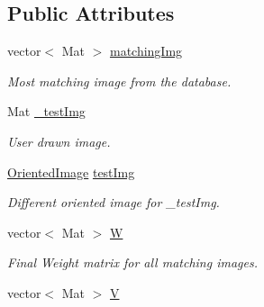\subsection*{\-Public \-Attributes}
\begin{DoxyCompactItemize}
\item 
\hypertarget{classWeightImage_aaca9acca67aadca4d8fa84d1c8d98490}{vector$<$ \-Mat $>$ \hyperlink{classWeightImage_aaca9acca67aadca4d8fa84d1c8d98490}{matching\-Img}}\label{classWeightImage_aaca9acca67aadca4d8fa84d1c8d98490}

\begin{DoxyCompactList}\small\item\em \-Most matching image from the database. \end{DoxyCompactList}\item 
\hypertarget{classWeightImage_a4eaa7ea2349186695b204b8d2bc00915}{\-Mat \hyperlink{classWeightImage_a4eaa7ea2349186695b204b8d2bc00915}{\-\_\-test\-Img}}\label{classWeightImage_a4eaa7ea2349186695b204b8d2bc00915}

\begin{DoxyCompactList}\small\item\em \-User drawn image. \end{DoxyCompactList}\item 
\hypertarget{classWeightImage_abf088bef022ae9533b835145c98512ea}{\hyperlink{classOrientedImage}{\-Oriented\-Image} \hyperlink{classWeightImage_abf088bef022ae9533b835145c98512ea}{test\-Img}}\label{classWeightImage_abf088bef022ae9533b835145c98512ea}

\begin{DoxyCompactList}\small\item\em \-Different oriented image for \-\_\-test\-Img. \end{DoxyCompactList}\item 
\hypertarget{classWeightImage_ad5eb5fe21dee1079c1b90e7d595e7860}{vector$<$ \-Mat $>$ \hyperlink{classWeightImage_ad5eb5fe21dee1079c1b90e7d595e7860}{\-W}}\label{classWeightImage_ad5eb5fe21dee1079c1b90e7d595e7860}

\begin{DoxyCompactList}\small\item\em \-Final \-Weight matrix for all matching images. \end{DoxyCompactList}\item 
\hypertarget{classWeightImage_a84ec6c3e7d354edec8681cd1e35f8659}{vector$<$ \-Mat $>$ \hyperlink{classWeightImage_a84ec6c3e7d354edec8681cd1e35f8659}{\-V}}\label{classWeightImage_a84ec6c3e7d354edec8681cd1e35f8659}


\end{DoxyCompactItemize}
